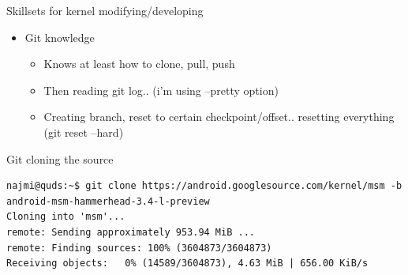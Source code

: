 \documentclass{beamer}
\begin{document}
\begin{frame}{Skillsets for kernel modifying/developing}
\begin{itemize}
 \item Git knowledge
 \begin{itemize}
  \item Knows at least how to clone, pull, push
  \item Then reading git log.. (i'm using --pretty option)
  \item Creating branch, reset to certain checkpoint/offset.. resetting everything (git reset --hard)
 \end{itemize}

 
\end{itemize}

 
\end{frame}


\begin{frame}[fragile]{Git cloning the source}
 \tiny{\begin{verbatim}
najmi@quds:~$ git clone https://android.googlesource.com/kernel/msm -b android-msm-hammerhead-3.4-l-preview
Cloning into 'msm'...
remote: Sending approximately 953.94 MiB ...
remote: Finding sources: 100% (3604873/3604873)
Receiving objects:   0% (14589/3604873), 4.63 MiB | 656.00 KiB/s
 \end{verbatim}}
\end{frame}
\end{document}

